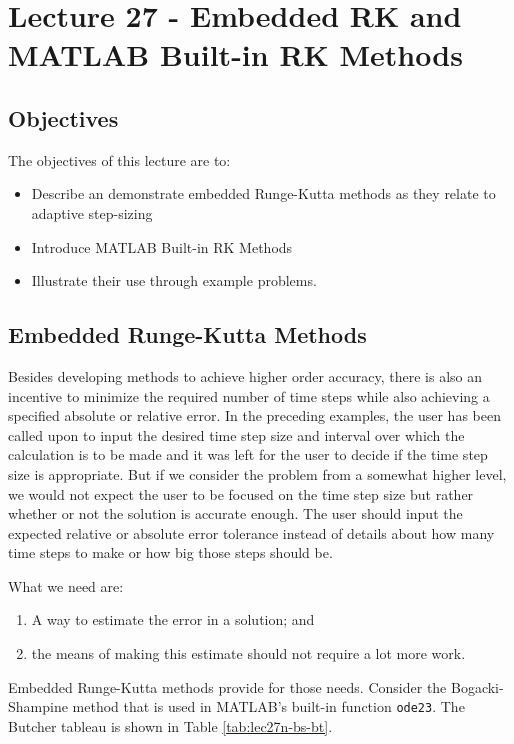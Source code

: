 \chapter{Lecture 27 - Embedded RK and MATLAB Built-in RK Methods}
\label{ch:lec27n}
\section{Objectives}
The objectives of this lecture are to:
\begin{itemize}
\item Describe an demonstrate embedded Runge-Kutta methods as they relate to adaptive step-sizing
\item Introduce MATLAB Built-in RK Methods
\item Illustrate their use through example problems.
\end{itemize}
\setcounter{lstannotation}{0}

\section{Embedded Runge-Kutta Methods}
Besides developing methods to achieve higher order accuracy, there is also an incentive to minimize the required number of time steps while also achieving a specified absolute or relative error.  In the preceding examples, the user has been called upon to input the desired time step size and interval over which the calculation is to be made and it was left for the user to decide if the time step size is appropriate.  But if we consider the problem from a somewhat higher level, we would not expect the user to be focused on the time step size but rather whether or not the solution is accurate enough.  The user should input the expected relative or absolute error tolerance instead of details about how many time steps to make or how big those steps should be.

What we need are:
\begin{enumerate}
\item A way to estimate the error in a solution; and
\item the means of making this estimate should not require a lot more work.
\end{enumerate}  

Embedded Runge-Kutta methods provide for those needs.  Consider the Bogacki-Shampine method that is used in MATLAB's built-in function \lstinline[style=myMatlab]{ode23}.\cite{bogacki19893} The Butcher tableau is shown in Table \ref{tab:lec27n-bs-bt}.


